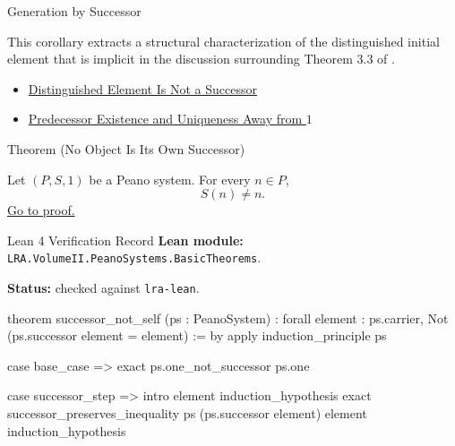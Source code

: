 \begin{topicbox}{Generation by Successor}
\begin{remark*}
This corollary extracts a structural characterization of the distinguished
initial element that is implicit in the discussion surrounding Theorem 3.3 of
\citet{FefermanNumberSystems1964}.
\end{remark*}

\begin{dependencies}
\begin{itemize}
  \item \hyperref[ax:peano-base-not-successor]{Distinguished Element Is Not a Successor}
  \item \hyperref[cor:predecessor-exists-unique-away-from-one]{Predecessor Existence and Uniqueness Away from $1$}
\end{itemize}
\end{dependencies}

\begin{theorembox}{Theorem (No Object Is Its Own Successor)}
\begin{theorem}
\label{thm:no-object-is-its-own-successor}
Let $(P,S,1)$ be a Peano system. For every $n \in P$,
\[
S(n) \neq n.
\]
\hyperref[prf:no-object-is-its-own-successor]{Go to proof.}
\end{theorem}
\end{theorembox}

\begin{formalizationrecord}{Lean 4 Verification Record}
\textbf{Lean module:} \texttt{LRA.VolumeII.PeanoSystems.BasicTheorems}.\par
{}
\textbf{Status:} checked against \texttt{lra-lean}.\par

\begin{leancode}
theorem successor_not_self
    (ps : PeanoSystem) :
    forall element : ps.carrier,
      Not (ps.successor element = element) := by
  apply induction_principle ps

  case base_case =>
    exact ps.one_not_successor ps.one

  case successor_step =>
    intro element induction_hypothesis
    exact
      successor_preserves_inequality
        ps
        (ps.successor element)
        element
        induction_hypothesis
\end{leancode}
\end{formalizationrecord}


\end{topicbox}
